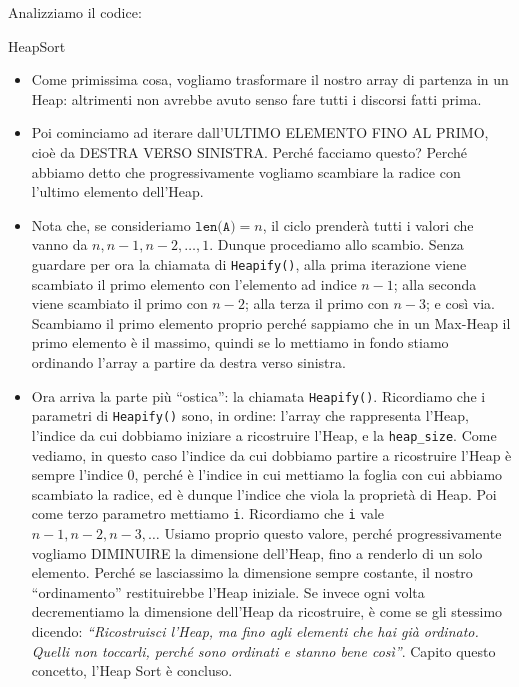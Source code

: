 \documentclass[12pt]{report}
\begin{document}
    Analizziamo il codice:
    \begin{algoritmo}{HeapSort}{}
    	\begin{itemize}
    		
    		\item Come primissima cosa, vogliamo trasformare il nostro array di partenza in un Heap: altrimenti non avrebbe avuto senso fare tutti i discorsi fatti prima.
    		
    		\item Poi cominciamo ad iterare dall'ULTIMO ELEMENTO FINO AL PRIMO, cioè da DESTRA VERSO SINISTRA. Perché facciamo questo? Perché abbiamo detto che progressivamente vogliamo scambiare la radice con l'ultimo elemento dell'Heap.
    		
    		\item Nota che, se consideriamo $\texttt{len(A)} = n$, il ciclo prenderà tutti i valori che vanno da $n, n-1, n-2, \dots, 1$. Dunque procediamo allo scambio. Senza guardare per ora la chiamata di \texttt{Heapify()}, alla prima iterazione viene scambiato il primo elemento con l'elemento ad indice $n-1$; alla seconda viene scambiato il primo con $n-2$; alla terza il primo con $n-3$; e così via. Scambiamo il primo elemento proprio perché sappiamo che in un Max-Heap il primo elemento è il massimo, quindi se lo mettiamo in fondo stiamo ordinando l'array a partire da destra verso sinistra.
    		
    		\item Ora arriva la parte più ``ostica'': la chiamata \texttt{Heapify()}. Ricordiamo che i parametri di \texttt{Heapify()} sono, in ordine: l'array che rappresenta l'Heap, l'indice da cui dobbiamo iniziare a ricostruire l'Heap, e la \texttt{heap\_size}. Come vediamo, in questo caso l'indice da cui dobbiamo partire a ricostruire l'Heap è sempre l'indice $0$, perché è l'indice in cui mettiamo la foglia con cui abbiamo scambiato la radice, ed è dunque l'indice che viola la proprietà di Heap. Poi come terzo parametro mettiamo \texttt{i}. Ricordiamo che \texttt{i} vale $n-1, n-2, n-3, \dots$ Usiamo proprio questo valore, perché progressivamente vogliamo DIMINUIRE la dimensione dell'Heap, fino a renderlo di un solo elemento. Perché se lasciassimo la dimensione sempre costante, il nostro ``ordinamento'' restituirebbe l'Heap iniziale. Se invece ogni volta decrementiamo la dimensione dell'Heap da ricostruire, è come se gli stessimo dicendo: \textit{``Ricostruisci l'Heap, ma fino agli elementi che hai già ordinato. Quelli non toccarli, perché sono ordinati e stanno bene così''}. Capito questo concetto, l'Heap Sort è concluso.
    		
    	\end{itemize}
    \end{algoritmo}
    	
\end{document}
